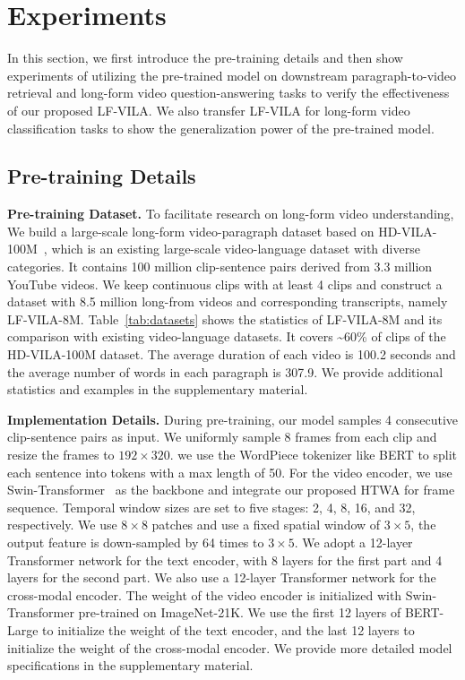 \documentclass{article}
\begin{document}
\section{Experiments}
\label{exp}
In this section, we first introduce the pre-training details and then show experiments of utilizing the pre-trained model on downstream paragraph-to-video retrieval and long-form video question-answering tasks to verify the effectiveness of our proposed LF-VILA. We also transfer LF-VILA for long-form video classification tasks to show the generalization power of the pre-trained model.

\subsection{Pre-training Details}

\textbf{Pre-training Dataset.} 
To facilitate research on long-form video understanding, We build a large-scale long-form video-paragraph dataset based on HD-VILA-100M~\cite{xue2021hdvila}, which is an existing large-scale video-language dataset with diverse categories. It contains 100 million clip-sentence pairs derived from 3.3 million YouTube videos. We keep continuous clips with at least 4 clips and construct a dataset with 8.5 million long-from videos and corresponding transcripts, namely LF-VILA-8M. Table~\ref{tab:datasets} shows the statistics of LF-VILA-8M and its comparison with existing video-language datasets.
It covers \textasciitilde 60\% of clips of the HD-VILA-100M dataset.
The average duration of each video is 100.2 seconds and the average number of words in each paragraph is 
307.9. We provide additional statistics and examples in the supplementary material.


\textbf{Implementation Details.}
During pre-training, our model samples 4 consecutive clip-sentence pairs as input. We uniformly sample 8 frames from each clip and resize the frames to $192 \times 320$. we use the WordPiece tokenizer like BERT to split each sentence into tokens with a max length of 50.
For the video encoder, we use Swin-Transformer~\cite{liu2021swin} as the backbone and integrate our proposed HTWA for frame sequence. 
Temporal window sizes are set to five stages: 2, 4, 8, 16, and 32, respectively.
We use $8 \times 8$ patches and use a fixed spatial window of $3\times 5$, the output feature is down-sampled by 64 times to $3 \times 5$.  We adopt a 12-layer Transformer network for the text encoder, with 8 layers for the first part and 4 layers for the second part. We also use a 12-layer Transformer network for the cross-modal encoder. The weight of the video encoder is initialized with Swin-Transformer pre-trained on ImageNet-21K. We use the first 12 layers of BERT-Large to initialize the weight of the text encoder, and the last 12 layers to initialize the weight of the cross-modal encoder. We provide more detailed model specifications in the supplementary material.
\end{document}
